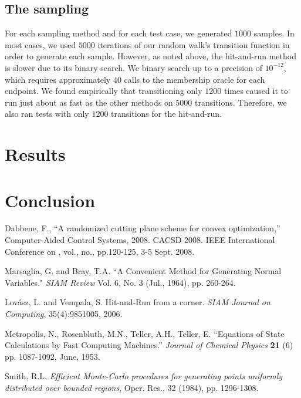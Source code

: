 \documentclass[11pt]{article}
\begin{document}
\subsection{The sampling}

For each sampling method and for each test case, we generated $1000$ samples. In most cases, we used $5000$ iterations of our random walk's transition function in order to generate each sample. However, as noted above, the hit-and-run method is slower due to its binary search. We binary search up to a precision of $10^{-12}$, which requires approximately $40$ calls to the membership oracle for each endpoint. We found empirically that transitioning only $1200$ times caused it to run just about as fast as the other methods on $5000$ transitions. Therefore, we also ran tests with only $1200$ transitions for the hit-and-run.

\section{Results}

\section{Conclusion}

\pagebreak

\begin{thebibliography}{99}

 Dabbene, F., ``A randomized cutting plane scheme for convex optimization,'' Computer-Aided Control Systems, 2008. CACSD 2008. IEEE International Conference on , vol., no., pp.120-125, 3-5 Sept. 2008.

 Marsaglia, G. and Bray, T.A. ``A Convenient Method for Generating Normal Variables." \emph{SIAM Review} Vol. 6, No. 3 (Jul., 1964), pp. 260-264.

 Lov\'asz, L. and Vempala, S. Hit-and-Run from a corner. \emph{SIAM Journal on Computing}, 35(4):9851005, 2006.

 Metropolis, N., Rosenbluth, M.N., Teller, A.H., Teller, E. ``Equations of State Calculations by Fast Computing Machines.'' \emph{Journal of Chemical Physics} \textbf{21} (6) pp. 1087-1092, June, 1953.

 Smith, R.L. \emph{Efficient Monte-Carlo procedures for generating points uniformly distributed over
bounded regions}, Oper. Res., 32 (1984), pp. 1296-1308.

\end{thebibliography}
\end{document}
